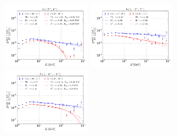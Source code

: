 \begin{figure}[h!]
\includegraphics[width=0.33\textwidth]{plots/SED_boxes_source_4cutoff.pdf}
\includegraphics[width=0.33\textwidth]{plots/SED_boxes_source_0cutoff.pdf}
\includegraphics[width=0.33\textwidth]{plots/SED_boxes_source_-4cutoff.pdf}

\end{figure}
